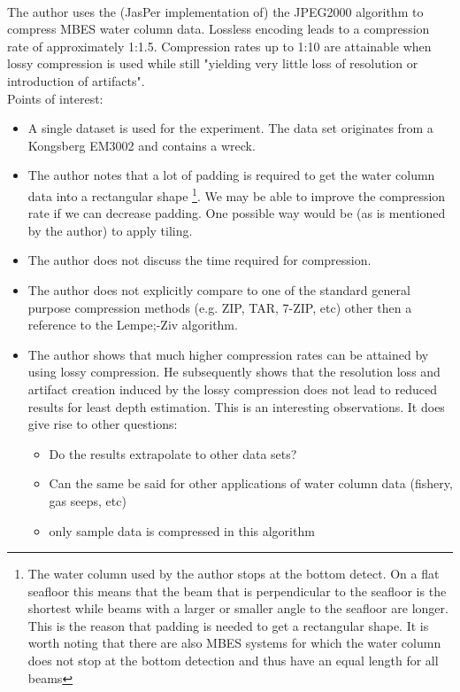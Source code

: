 \cite{beaudoin2010application}\\
The author uses the (JasPer implementation of) the JPEG2000 algorithm to compress MBES water column data. Lossless encoding leads to a compression rate of approximately 1:1.5. Compression rates up to 1:10 are attainable when lossy compression is used while still "yielding very little loss of resolution or introduction of artifacts". 
\\
Points of interest:\\
\begin{itemize}
\item A single dataset is used for the experiment. The data set originates from a Kongsberg EM3002 and contains a wreck.
\item The author notes that a lot of padding is required to get the water column data into a rectangular shape
\footnote{The water column used by the author stops at the bottom detect. On a flat seafloor this means that the beam that is perpendicular to the seafloor is the shortest while beams with a larger or smaller angle to the seafloor are longer. This is the reason that padding is needed to get a rectangular shape. It is worth noting that there are also MBES systems for which the water column does not stop at the bottom detection and thus have an equal length for all beams}. We may be able to improve the compression rate if we can decrease padding. One possible way would be (as is mentioned by the author) to apply tiling.
\item The author does not discuss the time required for compression.
\item The author does not explicitly compare to one of the standard general purpose compression methods (e.g. ZIP, TAR, 7-ZIP, etc) other then a reference to the Lempe;-Ziv algorithm.
\item The author shows that much higher compression rates can be attained by using lossy compression. He subsequently shows that the resolution loss and artifact creation induced by the lossy compression does not lead to reduced results for least depth estimation. This is an interesting observations. It does give rise to other questions:
{\begin{itemize}
\item Do the results extrapolate to other data sets?
\item Can the same be said for other applications of water column data (fishery, gas seeps, etc)
\item only sample data is compressed in this algorithm

\end{itemize}}
\end{itemize}
